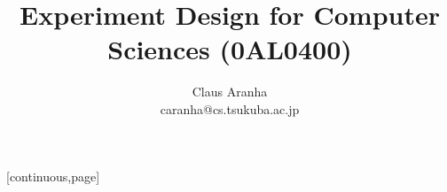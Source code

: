 \usepackage{amssymb,amsmath}
\usepackage{graphicx}
\usepackage{url}
\usepackage{color}
\usepackage{pagenote}[continuous,page]
\usepackage{cancel}   %
\usepackage{relsize}	%
\usepackage{url}			%
\usepackage{epstopdf}	%

\usepackage{tikz}%
\usetikzlibrary{mindmap,trees,arrows}%






{
}
\beamertemplatenavigationsymbolsempty

\usepackage[english]{babel}
\usepackage{subfigure}

\usepackage{times}
\usepackage[T1]{fontenc}
\usepackage{CJKutf8}

\makepagenote
\renewcommand{\notenumintext}[1]{}
\newcommand{\ppagenote}[1]{\pagenote[Page \insertframenumber]{#1}}

\title[Experiment Design (0AL0400)]{Experiment Design for Computer Sciences (0AL0400)}
\author[Claus Aranha]{Claus Aranha\\{\footnotesize caranha@cs.tsukuba.ac.jp}}
